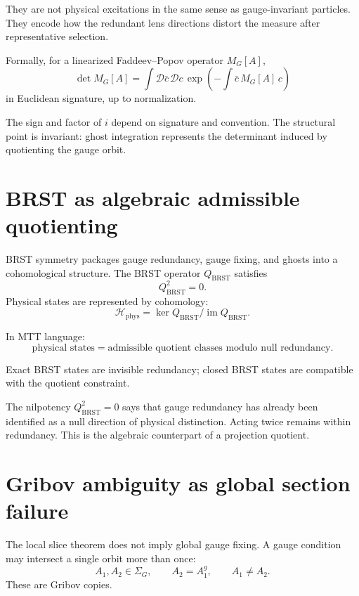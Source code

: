 \documentclass[11pt]{article}
\begin{document}
They are not physical excitations in the same sense as gauge-invariant particles. They encode how the redundant lens directions distort the measure after representative selection.

\begin{proposition}
Formally, for a linearized Faddeev--Popov operator \(M_G[A]\),
\[
\det M_G[A]
=
\int \mathcal D\bar c\,\mathcal Dc\,
\exp\left(-\int \bar c\,M_G[A]\,c\right)
\]
in Euclidean signature, up to normalization.
\end{proposition}

\begin{remark}
The sign and factor of \(i\) depend on signature and convention. The structural point is invariant: ghost integration represents the determinant induced by quotienting the gauge orbit.
\end{remark}

\section{BRST as algebraic admissible quotienting}

BRST symmetry packages gauge redundancy, gauge fixing, and ghosts into a cohomological structure. The BRST operator \(Q_{\mathrm{BRST}}\) satisfies
\[
Q_{\mathrm{BRST}}^2=0.
\]
Physical states are represented by cohomology:
\[
\mathcal H_{\mathrm{phys}}
=
\ker Q_{\mathrm{BRST}}/\operatorname{im}Q_{\mathrm{BRST}}.
\]

In MTT language:
\[
\boxed{
\text{physical states}=
\text{admissible quotient classes modulo null redundancy}.
}
\]

Exact BRST states are invisible redundancy; closed BRST states are compatible with the quotient constraint.

\begin{remark}
The nilpotency \(Q_{\mathrm{BRST}}^2=0\) says that gauge redundancy has already been identified as a null direction of physical distinction. Acting twice remains within redundancy. This is the algebraic counterpart of a projection quotient.
\end{remark}

\section{Gribov ambiguity as global section failure}

The local slice theorem does not imply global gauge fixing. A gauge condition may intersect a single orbit more than once:
\[
A_1,A_2\in\Sigma_G,\qquad A_2=A_1^g,\qquad A_1\ne A_2.
\]
These are Gribov copies.
\end{document}
